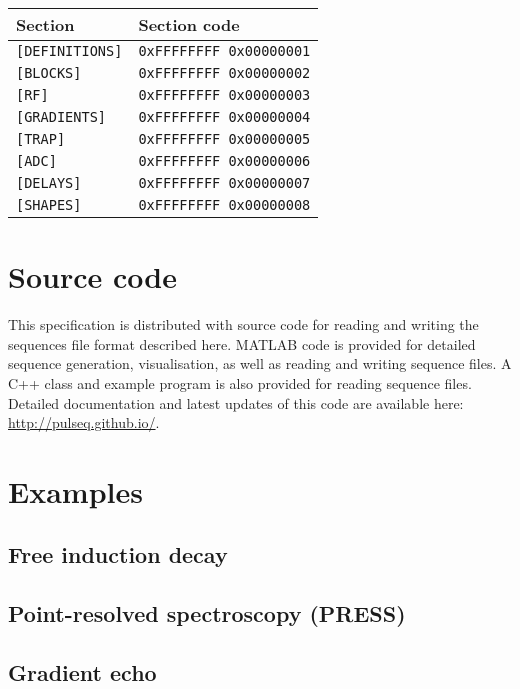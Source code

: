 \documentclass{article}
\begin{document}
\begin{center}
\begin{tabular}{ll}
\toprule
Section & Section code \\
\midrule
\verb.[DEFINITIONS]. & \verb.0xFFFFFFFF 0x00000001. \\
\verb.[BLOCKS]. & \verb.0xFFFFFFFF 0x00000002. \\
\verb.[RF]. & \verb.0xFFFFFFFF 0x00000003. \\
\verb.[GRADIENTS]. & \verb.0xFFFFFFFF 0x00000004. \\
\verb.[TRAP]. & \verb.0xFFFFFFFF 0x00000005. \\
\verb.[ADC]. & \verb.0xFFFFFFFF 0x00000006. \\
\verb.[DELAYS]. & \verb.0xFFFFFFFF 0x00000007. \\
\verb.[SHAPES]. & \verb.0xFFFFFFFF 0x00000008. \\
\bottomrule
\end{tabular}
\end{center}

\section{Source code}
This specification is distributed with source code for reading and writing the sequences file format described here. MATLAB code is provided for detailed sequence generation, visualisation, as well as reading and writing sequence files. A C++ class and example program is also provided for reading sequence files. Detailed documentation and latest updates of this code are available here: \url{http://pulseq.github.io/}.

\newpage
\section{Examples}

\subsection{Free induction decay}



\subsection{Point-resolved spectroscopy (PRESS)}



\subsection{Gradient echo}


\end{document}
